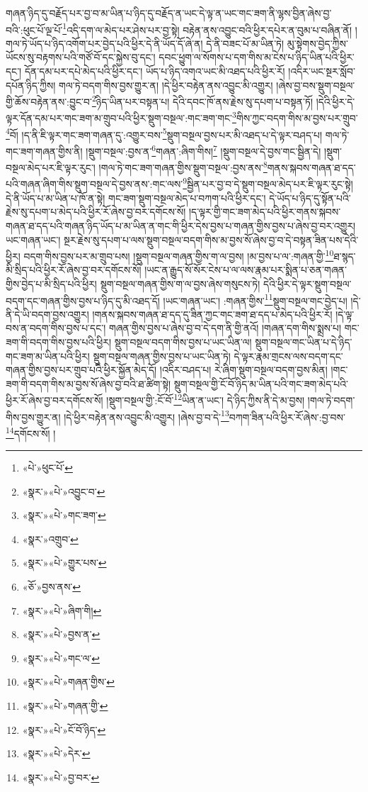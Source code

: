 གཞན་ཉིད་དུ་བརྗོད་པར་བྱ་བ་མ་ཡིན་པ་ཉིད་དུ་བརྗོད་ན་ཡང་དེ་ལྟ་ན་ཡང་གང་ཟག་ནི་ལྷས་བྱིན་ཞེས་བྱ་བའི་:ཕུང་པོ་ལྔ་པོ་\footnote{«པེ་»ཕུང་པོ་}འདི་དག་ལ་མེད་པར་ཤེས་པར་བྱ་སྟེ། བརྟེན་ནས་འབྱུང་བའི་ཕྱིར་དཔེར་ན་བུམ་པ་བཞིན་ནོ། །གལ་ཏེ་ཡོད་པ་ཉིད་འགོག་པར་བྱེད་པའི་ཕྱིར་དེ་ནི་ཡོད་དོ་ཞེ་ན། དེ་ནི་བཟང་པོ་མ་ཡིན་ཏེ། མུ་སྟེགས་བྱེད་ཀྱིས་ཡོངས་སུ་བརྟགས་པའི་གཙོ་བོ་དང་སྐྱེས་བུ་དང་། དབང་ཕྱུག་ལ་སོགས་པ་དག་གིས་མ་ངེས་པ་ཉིད་ཡིན་པའི་ཕྱིར་དང་། དོན་དམ་པར་དཔེ་མེད་པའི་ཕྱིར་དང་། ཡོད་པ་ཉིད་འགའ་ཡང་མི་འཐད་པའི་ཕྱིར་རོ། །འདིར་ཡང་སྔར་སློབ་དཔོན་ཉིད་ཀྱིས། གལ་ཏེ་བདག་གིས་བྱས་གྱུར་ན། །དེ་ཕྱིར་བརྟེན་ནས་འབྱུང་མི་འགྱུར། །ཞེས་བྱ་བས་སྡུག་བསྔལ་གྱི་ཆོས་བརྟེན་ནས་:བྱུང་བ་\footnote{«སྣར་»«པེ་»འབྱུང་བ་}ཉིད་ཡིན་པར་བསྟན་པ། དེའི་དབང་ཁོ་ནས་རྗེས་སུ་དཔག་པ་བསྟན་ཏོ། །དེའི་ཕྱིར་དེ་ལྟར་དོན་དམ་པར་གང་ཟག་མ་གྲུབ་པའི་ཕྱིར་སྡུག་བསྔལ་:གང་ཟག་གང་\footnote{«སྣར་»«པེ་»གང་ཟག་}གིས་ཀྱང་བདག་གིས་མ་བྱས་པར་གྲུབ་\footnote{«སྣར་»འགྲུབ་}བོ། །ད་ནི་ཇི་ལྟར་གང་ཟག་གཞན་དུ་:འགྱུར་བས་\footnote{«སྣར་»«པེ་»གྱུར་པས་}སྡུག་བསྔལ་བྱས་པར་མི་འཐད་པ་དེ་ལྟར་བཤད་པ། གལ་ཏེ་གང་ཟག་གཞན་གྱིས་ནི། །སྡུག་བསྔལ་:བྱས་ན་\footnote{«ཅོ་»བྱས་ནས་}གཞན་:ཞིག་གིས།\footnote{«སྣར་»«པེ་»ཞིག་གི།} །སྡུག་བསྔལ་དེ་བྱས་གང་སྦྱིན་དེ། །སྡུག་བསྔལ་མེད་པར་ཇི་ལྟར་རུང་། །གལ་ཏེ་གང་ཟག་གཞན་གྱིས་སྡུག་བསྔལ་:བྱས་ནས་\footnote{«སྣར་»«པེ་»བྱས་ན་}གནས་སྐབས་གཞན་ཐ་དད་པའི་གཞན་ཞིག་གིས་སྡུག་བསྔལ་དེ་བྱས་ནས་:གང་ལས་\footnote{«སྣར་»«པེ་»གང་ལ་}སྦྱིན་པར་བྱ་བ་དེ་སྡུག་བསྔལ་མེད་པར་ཇི་ལྟར་རུང་སྟེ། དེ་ནི་ཡོད་པ་མ་ཡིན་པ་ཁོ་ན་སྟེ། གང་ཟག་སྡུག་བསྔལ་མེད་པ་བཀག་པའི་ཕྱིར་དང་། དེ་ཡོད་པ་ཉིད་དུ་སྟོན་པའི་རྗེས་སུ་དཔག་པ་མེད་པའི་ཕྱིར་རོ་ཞེས་བྱ་བར་དགོངས་སོ། །ད་ལྟར་གྱི་གང་ཟག་མེད་པའི་ཕྱིར་གནས་སྐབས་གཞན་ཐ་དད་པའི་གཞན་ཉིད་ཡོད་པ་མ་ཡིན་ན་གང་གི་ཕྱིར་དེས་བྱས་པ་གཞན་གྱིས་བྱས་པ་ཞེས་བྱ་བར་འགྱུར། ཡང་གཞན་ཡང་། སྔར་རྗེས་སུ་དཔག་པ་ལས་སྡུག་བསྔལ་བདག་གིས་མ་བྱས་སོ་ཞེས་བྱ་བ་དེ་བསྟན་ཟིན་པས་དེའི་ཕྱིར། བདག་གིས་བྱས་པར་མ་གྲུབ་པས། །སྡུག་བསྔལ་གཞན་གྱིས་ག་ལ་བྱས། །མ་བྱས་པ་ལ་:གཞན་གྱི་\footnote{«སྣར་»«པེ་»གཞན་གྱིས་}ཐ་སྙད་མི་སྲིད་པའི་ཕྱིར་རོ་ཞེས་བྱ་བར་དགོངས་སོ། །ཡང་ན་རྒྱུད་སོ་སོར་ངེས་པ་ལ་ལས་རྣམ་པར་སྨིན་པ་ཅན་གཞན་གྱིས་བྱེད་པ་མི་སྲིད་པའི་ཕྱིར། སྡུག་བསྔལ་གཞན་གྱིས་ག་ལ་བྱས་ཞེས་གསུངས་ཏེ། དེའི་ཕྱིར་དེ་ལྟར་སྡུག་བསྔལ་བདག་དང་གཞན་གྱིས་བྱས་པ་ཉིད་དུ་མི་འཐད་དོ། །ཡང་གཞན་ཡང་། :གཞན་གྱིས་\footnote{«སྣར་»«པེ་»གཞན་གྱི་}སྡུག་བསྔལ་གང་བྱེད་པ། །དེ་ནི་དེ་ཡི་བདག་བྱས་འགྱུར། །གནས་སྐབས་གཞན་ཐ་དད་དུ་ཟིན་ཀྱང་གང་ཟག་ཐ་དད་པ་མེད་པའི་ཕྱིར་རོ། །དེ་ལྟ་བས་ན་བདག་གིས་བྱས་པ་དང་། གཞན་གྱིས་བྱས་པ་ཞེས་བྱ་བ་དེ་དག་ནི་གྱི་ནའོ། །གཞན་དག་གིས་སྨྲས་པ། གང་ཟག་གི་བདག་གིས་བྱས་པའི་ཕྱིར། སྡུག་བསྔལ་བདག་གིས་བྱས་པ་ཡང་ཡིན་ལ། སྡུག་བསྔལ་གང་ཡིན་པ་དེ་ཉིད་གང་ཟག་མ་ཡིན་པའི་ཕྱིར། སྡུག་བསྔལ་གཞན་གྱིས་བྱས་པ་ཡང་ཡིན་ཏེ། དེ་ལྟར་རྣམ་གྲངས་ལས་བདག་དང་གཞན་གྱིས་བྱས་པར་གྲུབ་པའི་ཕྱིར་སྐྱོན་མེད་དོ། །འདིར་བཤད་པ། རེ་ཞིག་སྡུག་བསྔལ་བདག་བྱས་མིན། །གང་ཟག་གི་བདག་གིས་མ་བྱས་སོ་ཞེས་བྱ་བའི་ཐ་ཚིག་སྟེ། སྡུག་བསྔལ་གྱི་ངོ་བོ་ཉིད་མ་ཡིན་པའི་གང་ཟག་མེད་པའི་ཕྱིར་རོ་ཞེས་བྱ་བར་དགོངས་སོ། །སྡུག་བསྔལ་གྱི་:ངོ་བོ་\footnote{«སྣར་»«པེ་»ངོ་བོ་ཉིད་}ཡིན་ན་ཡང་། དེ་ཉིད་ཀྱིས་ནི་དེ་མ་བྱས། །གལ་ཏེ་བདག་གིས་བྱས་གྱུར་ན། །དེ་ཕྱིར་བརྟེན་ནས་འབྱུང་མི་འགྱུར། །ཞེས་བྱ་བ་དེ་\footnote{«སྣར་»«པེ་»དེར་}བཀག་ཟིན་པའི་ཕྱིར་རོ་ཞེས་:བྱ་བས་\footnote{«སྣར་»«པེ་»བྱ་བར་}དགོངས་སོ། །

